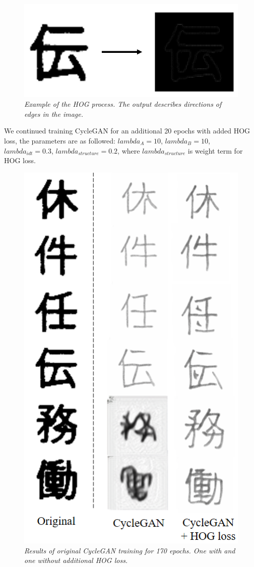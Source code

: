 \documentclass[12pt]{report}
\begin{document}
\begin{figure}[h]
	\centering
	\includegraphics[scale=0.7]{hog}
	\caption{\textit{Example of the HOG process. The output describes directions of edges in the image.}}
	\label{fig:hog}
\end{figure}

We continued training CycleGAN for an additional 20 epochs with added HOG loss, the parameters are as followed: $lambda_A = 10$, $lambda_B = 10$, $lambda_{idt} = 0.3$, $lambda_{structure} = 0.2$, where $lambda_{structure}$ is weight term for HOG loss.

\begin{figure}[H]
	\centering
	\includegraphics[scale=0.9]{cycle-gan-result}
	\caption{\textit{Results of original CycleGAN training for 170 epochs. One with and one without additional HOG loss.}}
	\label{fig:cycle-gan-result}
\end{figure}
\end{document}
